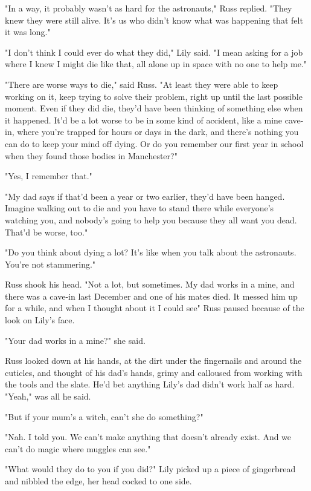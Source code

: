 "In a way, it probably wasn't as hard for the astronauts," Russ replied. "They knew they were still alive. It's us who didn't know what was happening that felt it was long."

"I don't think I could ever do what they did," Lily said. "I mean asking for a job where I knew I might die like that, all alone up in space with no one to help me."

"There are worse ways to die," said Russ. "At least they were able to keep working on it, keep trying to solve their problem, right up until the last possible moment. Even if they did die, they'd have been thinking of something else when it happened. It'd be a lot worse to be in some kind of accident, like a mine cave-in, where you're trapped for hours or days in the dark, and there's nothing you can do to keep your mind off dying. Or do you remember our first year in school when they found those bodies in Manchester?"

"Yes, I remember that."

"My dad says if that'd been a year or two earlier, they'd have been hanged. Imagine walking out to die and you have to stand there while everyone's watching you, and nobody's going to help you because they all want you dead. That'd be worse, too."

"Do you think about dying a lot? It's like when you talk about the astronauts. You're not stammering."

Russ shook his head. "Not a lot, but sometimes. My dad works in a mine, and there was a cave-in last December and one of his mates died. It messed him up for a while, and when I thought about it I could see{\el}" Russ paused because of the look on Lily's face.

"Your dad works in a mine?" she said.

Russ looked down at his hands, at the dirt under the fingernails and around the cuticles, and thought of his dad's hands, grimy and calloused from working with the tools and the slate. He'd bet anything Lily's dad didn't work half as hard. "Yeah," was all he said.

"But if your mum's a witch, can't she do something?"

"Nah. I{\el} told you. We can't make{\el} anything that doesn't already{\el} exist. And we can't do{\el} magic where{\el} muggles can see."

"What would they do to you if you did?" Lily picked up a piece of gingerbread and nibbled the edge, her head cocked to one side.

